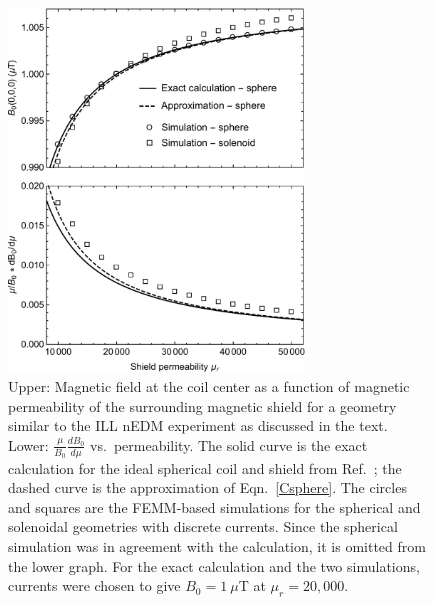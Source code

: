
\begin{figure}[h!]
\begin{center}
   \includegraphics[width=0.7\textwidth]{Fig_combined-crop.pdf}
   \caption[Magnetic field $B_0$ and$\frac{\mu}{B_0}\frac{dB_0}{d\mu}$
   versus $\mu$]{Upper: Magnetic field at the coil center as a
     function of magnetic permeability of the surrounding magnetic
     shield for a geometry similar to the ILL nEDM experiment as
     discussed in the text.  Lower: $\frac{\mu}{B_0}\frac{dB_0}{d\mu}$
     vs.~permeability.  The solid curve is the exact calculation for
     the ideal spherical coil and shield from
     Ref.~\cite{bidinosti2014passive}; the dashed curve is the
     approximation of Eqn.~\ref{Csphere}. The circles and squares are
     the FEMM-based simulations for the spherical and solenoidal
     geometries with discrete currents.  Since the spherical
     simulation was in agreement with the calculation, it is omitted
     from the lower graph.  For the exact calculation and the two
     simulations, currents were chosen to give $B_0=1~\mu$T at
     $\mu_r=20,000$.}
    \label{fig:Magnetic_Field}
    \end{center}
\end{figure} 


